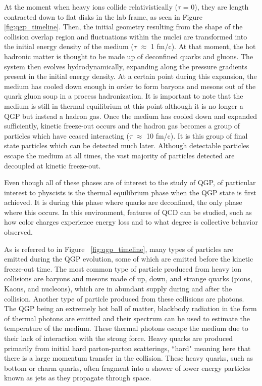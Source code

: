 At the moment when heavy ions collide relativistically ($\tau$ = 0), they are length contracted down to flat disks in the lab frame, as seen in Figure \ref{fig:qgp_timeline}. Then, the initial geometry resulting from the shape of the collision overlap region and fluctuations within the nuclei are transformed into the initial energy density of the medium ($\tau$ $\approx$ 1 fm/c). At that moment, the hot hadronic matter is thought to be made up of deconfined quarks and gluons. The system then evolves hydrodynamically, expanding along the pressure gradients present in the initial energy density. At a certain point during this expansion, the medium has cooled down enough in order to form baryons and mesons out of the quark gluon soup in a process hadronization. It is important to note that the medium is still in thermal equilibrium at this point although it is no longer a QGP but instead a hadron gas. Once the medium has cooled down and expanded sufficiently, kinetic freeze-out occurs and the hadron gas becomes a group of particles which have ceased interacting ($\tau$ $\approx$ 10 fm/c). It is this group of final state particles which can be detected much later. Although detectable particles escape the medium at all times, the vast majority of particles detected are decoupled at kinetic freeze-out. 

Even though all of these phases are of interest to the study of QGP, of particular interest to physcists is the thermal equilibrium phase when the QGP state is first achieved. It is during this phase where quarks are deconfined, the only phase where this occurs. In this environment, features of QCD can be studied, such as how color charges experience energy loss and to what degree is collective behavior observed. 

As is referred to in Figure ~\ref{fig:qgp_timeline}, many types of particles are emitted during the QGP evolution, some of which are emitted before the kinetic freeze-out time. The most common type of particle produced from heavy ion collisions are baryons and mesons made of up, down, and strange quarks (pions, Kaons, and nucleons), which are in abundant supply during and after the collision. Another type of particle produced from these collisions are photons. The QGP being an extremely hot ball of matter, blackbody radiation in the form of thermal photons are emitted and their spectrum can be used to estimate the temperature of the medium. These thermal photons escape the medium due to their lack of interaction with the strong force. Heavy quarks are produced primarily from initial hard parton-parton scatterings, ``hard" meaning here that there is a large momentum transfer in the collision. These heavy quarks, such as bottom or charm quarks, often fragment into a shower of lower energy particles known as jets as they propagate through space.

